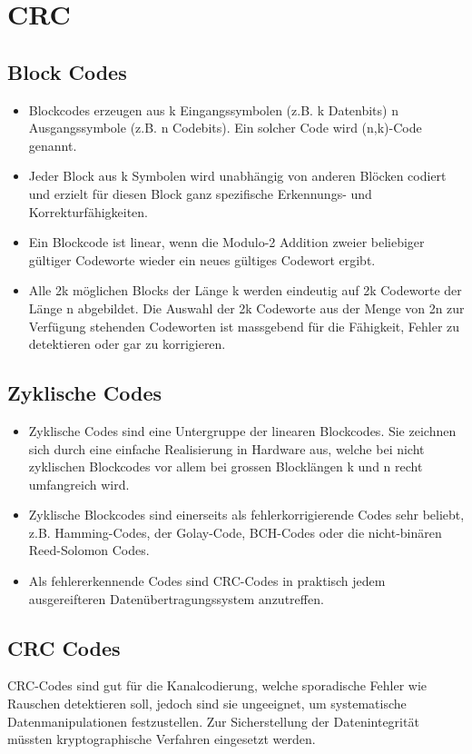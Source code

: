 \section{CRC}


\subsection{Block Codes}

\begin{itemize}
	\item	Blockcodes erzeugen aus k Eingangssymbolen (z.B. k Datenbits) n Ausgangssymbole (z.B. n Codebits). Ein solcher Code wird (n,k)-Code genannt.	
	\item Jeder Block aus k Symbolen wird unabhängig von anderen Blöcken codiert und erzielt für diesen Block ganz spezifische Erkennungs- und Korrekturfähigkeiten.
	\item Ein Blockcode ist linear, wenn die Modulo-2 Addition zweier beliebiger gültiger Codeworte wieder ein neues gültiges Codewort ergibt.
	\item Alle 2k möglichen Blocks der Länge k werden eindeutig auf 2k Codeworte der Länge n abgebildet. Die Auswahl der 2k Codeworte aus der Menge von 2n zur Verfügung stehenden Codeworten ist massgebend für die Fähigkeit, Fehler zu detektieren oder gar zu korrigieren.
\end{itemize}


\subsection{Zyklische Codes}
\begin{itemize}
	\item Zyklische Codes sind eine Untergruppe der linearen Blockcodes. Sie zeichnen sich durch eine einfache Realisierung in Hardware aus, welche bei nicht zyklischen Blockcodes vor allem bei grossen Blocklängen k und n recht umfangreich wird.
	\item Zyklische Blockcodes sind einerseits als fehlerkorrigierende Codes sehr beliebt, z.B. Hamming-Codes, der Golay-Code, BCH-Codes oder die nicht-binären Reed-Solomon Codes.
	\item Als fehlererkennende Codes sind CRC-Codes in praktisch jedem ausgereifteren
	Datenübertragungssystem anzutreffen.	
\end{itemize}

\subsection{CRC Codes}
CRC-Codes sind gut für die Kanalcodierung, welche sporadische Fehler wie Rauschen detektieren soll, jedoch sind sie ungeeignet, um systematische Datenmanipulationen festzustellen. Zur Sicherstellung der Datenintegrität müssten kryptographische Verfahren eingesetzt werden.

